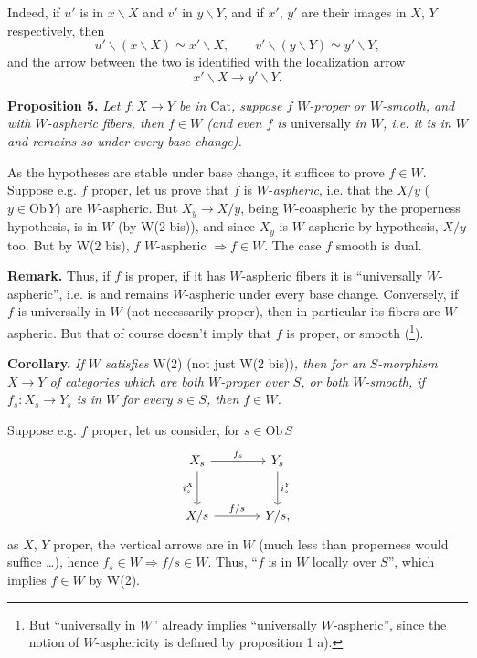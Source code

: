 \documentclass[11pt]{article}
\newcommand{\printedpage}[1]{\marginpar{\footnotesize p.~#1}}
\newcommand{\msp}[1]{\marginpar{\footnotesize [#1]}}
\newcommand{\Cat}{\mathrm{Cat}}
\newcommand{\Ob}{\mathrm{Ob}}
\begin{document}
\printedpage{24}
Indeed, if $u'$ is in $x\backslash X$ and $v'$ in $y\backslash Y$, and if $x'$, $y'$ are their images in $X$, $Y$ respectively, then
\[
u'\backslash(x\backslash X)\simeq x'\backslash X,\qquad v'\backslash(y\backslash Y)\simeq y'\backslash Y,
\]
and the arrow between the two is identified with the localization arrow
\[
x'\backslash X\longrightarrow y'\backslash Y.
\]

\textbf{Proposition 5.} \textit{Let $f : X\longrightarrow Y$ be in $\Cat$, suppose $f$ $W$-proper or $W$-smooth, and with $W$-aspheric fibers, then $f\in W$ (and even $f$ is} \textup{universally} \textit{in $W$, i.e. it is in $W$ and remains so under every base change).}

\leavevmode\msp{page 30}As the hypotheses are stable under base change, it suffices to prove $f\in W$. Suppose e.g. $f$ proper, let us prove that $f$ is $W$-\textit{aspheric}, i.e. that the $X/y$ ($y\in\Ob\,Y$) are $W$-aspheric. But $X_y\longrightarrow X/y$, being $W$-coaspheric by the properness hypothesis, is in $W$ (by W(2 bis)), and since $X_y$ is $W$-aspheric by hypothesis, $X/y$ too. But by W(2 bis), $f$ $W$-aspheric $\Longrightarrow f\in W$. The case $f$ smooth is dual.

\textbf{Remark.} Thus, if $f$ is proper, if it has $W$-aspheric fibers it is ``universally $W$-aspheric'', i.e. is and remains $W$-aspheric under every base change. Conversely, if $f$ is universally in $W$ (not necessarily proper), then in particular its fibers are $W$-aspheric. But that of course doesn't imply that $f$ is proper, or smooth (\footnote[44]{But ``universally in $W$'' already implies ``universally $W$-aspheric'', since the notion of $W$-asphericity is defined by proposition 1 a).}).

\textbf{Corollary.} \textit{If $W$ satisfies} \textup{W(2) (not just W(2 bis))}\textit{, then for an $S$-morphism $X\longrightarrow Y$ of categories which are both $W$-proper over $S$, or both $W$-smooth, if $f_s : X_s\longrightarrow Y_s$ is in $W$ for every $s\in S$, then $f\in W$.}

\leavevmode\msp{page 31}Suppose e.g. $f$ proper, let us consider, for $s\in\Ob\,S$
\[
\begin{tikzcd}[row sep=large, column sep=large]
X_s \arrow[r, "f_s"] \arrow[d, "i_s^X"'] & Y_s \arrow[d, "i_s^Y"] \\
X/s \arrow[r, "f/s"] & Y/s,
\end{tikzcd}
\]
as $X$, $Y$ proper, the vertical arrows are in $W$ (much less than properness would suffice \dots), hence $f_s\in W\Longrightarrow f/s\in W$. Thus, ``$f$ is in $W$ locally over $S$'', which implies $f\in W$ by W(2).
\end{document}
